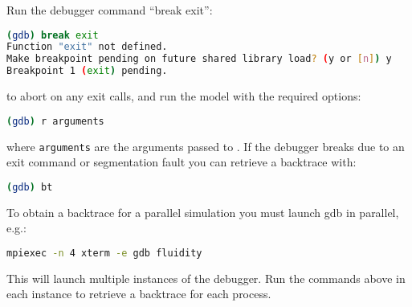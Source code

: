 Run the debugger command ``break exit'':

\begin{lstlisting}[language = Bash]
(gdb) break exit
Function "exit" not defined.
Make breakpoint pending on future shared library load? (y or [n]) y
Breakpoint 1 (exit) pending.
\end{lstlisting}

to abort on any exit calls, and run the model with the required options:

\begin{lstlisting}[language = Bash]
(gdb) r arguments
\end{lstlisting}

where \lstinline[language = Bash]*arguments* are the arguments passed to
\fluidity. If the debugger breaks due to an exit command or segmentation fault
you can retrieve a backtrace with:

\begin{lstlisting}[language = Bash]
(gdb) bt
\end{lstlisting}

To obtain a backtrace for a parallel simulation you must launch gdb in parallel,
e.g.:

\begin{lstlisting}[language = Bash]
mpiexec -n 4 xterm -e gdb fluidity
\end{lstlisting}

This will launch multiple instances of the debugger. Run the commands above in
each instance to retrieve a backtrace for each process.
